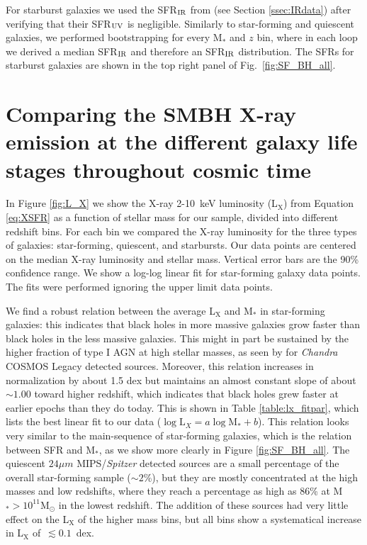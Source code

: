  For starburst galaxies we used the SFR$_{\rm IR}$ from \citet{2013MNRAS.432...23G} (see Section \ref{ssec:IRdata}) after  verifying that their SFR$_{\rm UV}$ is negligible. 
 Similarly to star-forming and quiescent galaxies, we performed bootstrapping for every M$_*$ and $z$ bin, where in each loop we derived a median SFR$_{\rm IR}$ and therefore an SFR$_{\rm IR}$ distribution.
 The SFRs for starburst galaxies are shown in the top right panel of Fig.~\ref{fig:SF_BH_all}.
 

\section{Comparing the SMBH X-ray emission at the different galaxy life stages throughout cosmic time}\label{sec:L_X}
In Figure \ref{fig:L_X} we show the X-ray 2-10~keV luminosity (L$_\text{X}$) from Equation \ref{eq:XSFR} as a function of stellar mass for our sample, divided into different redshift bins. For each bin we compared the X-ray luminosity for the three types of galaxies: star-forming, quiescent, and starbursts. Our data points are centered on the median X-ray luminosity and stellar mass. Vertical error bars are the 90\% confidence range. We show a log-log linear fit for star-forming galaxy data points. The fits were performed ignoring the upper limit data points.%
   
We find a robust relation between the average L$_\text{X}$ and M$_*$ in star-forming galaxies: this indicates that black holes in more massive galaxies grow faster than black holes in the less massive galaxies. This might in part be sustained by the higher fraction of type I AGN at high stellar masses, as seen by \citet{2019ApJ...872..168S} for \textit{Chandra} COSMOS Legacy detected sources. %
Moreover, this relation increases in normalization by about 1.5 dex but maintains an almost constant slope of about $\sim1.00$ toward higher redshift, which indicates that black holes grew faster at earlier epochs than they do today.  This is shown in Table \ref{table:lx_fitpar}, which lists the best linear fit to our data ($\log\text{L}_X=a\log\text{M}_*+b$).
This relation looks very similar to the main-sequence of star-forming galaxies, which is the relation between SFR and M$_*$, as we show more clearly in Figure \ref{fig:SF_BH_all}. The quiescent $24\mu m$ MIPS/\textit{Spitzer} detected sources are a small percentage of the overall star-forming sample ($\sim2$\%), but they are mostly concentrated at the high masses and low redshifts, where they reach a percentage as high as 86\% at M$_*>10^{11}$M${_\odot}$ in the lowest redshift. The addition of these sources had very little effect on the L$_\text{X}$ of the higher mass bins, but all bins show a systematical increase in L$_\text{X}$  of~$\lesssim 0.1$~dex.

